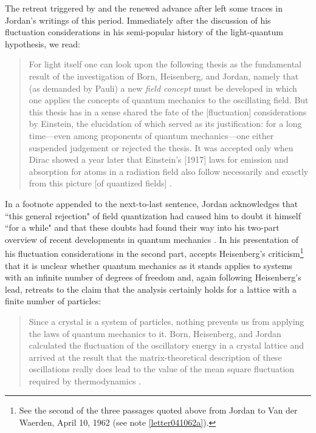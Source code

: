 \documentclass[12pt]{elsart}
\begin{document}
The retreat triggered by \citep{Smekal 1926} and the renewed advance after \citep{Dirac 1927} left some traces in Jordan's writings of this period.
Immediately after the discussion of his fluctuation considerations in his semi-popular history of the light-quantum hypothesis, we read:
\begin{quotation}
For light itself one can look upon the following thesis as the fundamental result of the investigation of Born, Heisenberg, and Jordan, namely that (as demanded by Pauli) a new {\it field concept} must be developed in which one applies the concepts of quantum mechanics to the oscillating field. But this thesis has in a sense shared the fate of the [fluctuation] considerations by Einstein, the elucidation of which served as its justification: for a long time---even among proponents of quantum mechanics---one either suspended judgement or rejected the thesis. It was accepted only when Dirac showed a year later that Einstein's [1917] laws for emission and absorption for atoms in a radiation field also follow necessarily and exactly from this picture [of quantized fields] \citep[pp.\ 195--196]{Jordan 1928}.
\end{quotation}
In a footnote appended to the next-to-last sentence, Jordan acknowledges that ``this general rejection" of field quantization had caused him to doubt it himself ``for a while" and that these doubts had found their way into his two-part overview of recent developments in quantum mechanics \citep{Jordan 1927a, Jordan 1927b}. In his presentation of his fluctuation considerations in the second part, \citet[pp.\ 642--643]{Jordan 1927b} accepts Heisenberg's criticism\footnote{See the second of the three passages quoted above from Jordan to Van der Waerden, April 10, 1962 (see note \ref{letter041062a}).} that it is unclear whether quantum mechanics as it stands applies to systems with an infinite number of degrees of freedom and, again following Heisenberg's lead, retreats to the claim that the analysis certainly holds for a lattice with a finite number of particles:
\begin{quotation}
Since a crystal is a system of  particles, nothing prevents us from applying the laws of quantum mechanics to it. Born, Heisenberg, and Jordan calculated the fluctuation of the oscillatory energy in a crystal lattice and arrived at the result that the matrix-theoretical description of these oscillations really does lead to the value of the mean square fluctuation required by thermodynamics \citep[p.\ 643]{Jordan 1927b}.
\end{quotation}
\end{document}
